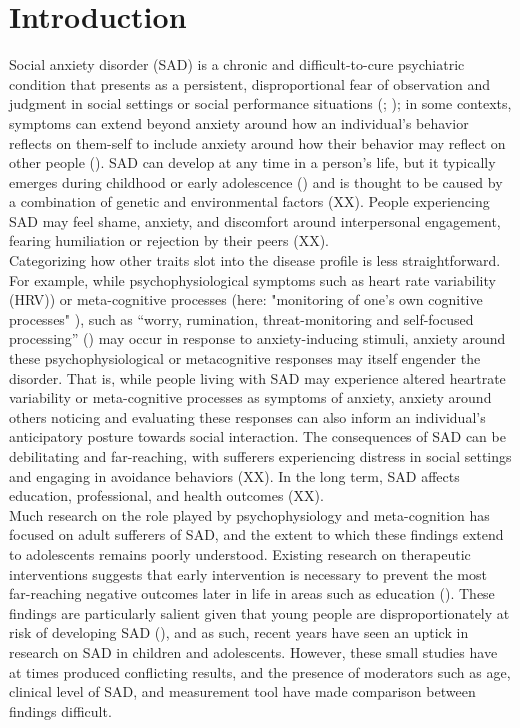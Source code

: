 \newpage
\chapter{Introduction} 

Social anxiety disorder (SAD) is a chronic and difficult-to-cure psychiatric condition that presents as a persistent, disproportional fear of observation and judgment in social settings or social performance situations (\cite{national_collaborating_centre_for_mental_health_uk_social_2013}; \cite{colonnesi_social_2017}); in some contexts, symptoms can extend beyond anxiety around how an individual’s behavior reflects on them-self to include anxiety around how their behavior may reflect on other people (\cite{jefferies_social_2020}). SAD can develop at any time in a person’s life, but it typically emerges during childhood or early adolescence (\cite{national_collaborating_centre_for_mental_health_uk_social_2013}) and is thought to be caused by a combination of genetic and environmental factors (XX).  People experiencing SAD may feel shame, anxiety, and discomfort around interpersonal engagement, fearing humiliation or rejection by their peers (XX).  \\
Categorizing how other traits slot into the disease profile is less straightforward. For example, while psychophysiological symptoms such as heart rate variability (HRV)) or meta-cognitive processes (here: "monitoring of one’s own cognitive processes" \cite{folz_facial_2023}), such as  “worry, rumination, threat-monitoring and self-focused processing” (\cite{nordahl_metacognition_2022}) may occur in response to anxiety-inducing stimuli, anxiety around these psychophysiological or metacognitive responses may itself engender the disorder. That is, while people living with SAD may experience altered heartrate variability or meta-cognitive processes as symptoms of anxiety, anxiety around others noticing and evaluating these responses can also inform an individual’s anticipatory posture towards social interaction. The consequences of SAD can be debilitating and far-reaching, with sufferers experiencing distress in social settings and engaging in avoidance behaviors (XX). In the long term, SAD affects education, professional, and health outcomes (XX). \\
Much research on the role played by psychophysiology and meta-cognition has focused on adult sufferers of SAD, and the extent to which these findings extend to adolescents remains poorly understood. Existing research on therapeutic interventions suggests that early intervention is necessary to prevent the most far-reaching negative outcomes later in life in areas such as education (\cite{vilaplana-perez_much_2021}). These findings are particularly salient given that young people are disproportionately at risk of developing SAD (\cite{jefferies_social_2020}), and as such, recent years have seen an uptick in research on SAD in children and adolescents. However, these small studies have at times produced conflicting results, and the presence of moderators such as age, clinical level of SAD, and measurement tool have made comparison between findings difficult. \\ 

